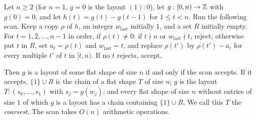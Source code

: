 \begin{theorem}\label{thm:decide}
Let $n \ge 2$ (for $n = 1$, $g = 0$ is the layout $(1){:}0$), let
$g : [0,n) \to \mathbb{Z}$ with $g(0) = 0$, and let $h(t) = g(t) - g(t-1)$ for
$1 \le t < n$. Run the following scan. Keep a copy $\rho$ of $h$, an integer
$w_{\mathrm{last}}$ initially $1$, and a set $R$ initially empty. For
$t = 1, 2, \dots, n-1$ in order, if $\rho(t) \ne 0$: if $t \nmid n$ or
$w_{\mathrm{last}} \nmid t$, reject; otherwise put $t$ in $R$, set
$a_t = \rho(t)$ and $w_{\mathrm{last}} = t$, and replace $\rho(t')$ by
$\rho(t') - a_t$ for every multiple $t'$ of $t$ in $[t, n)$. If no $t$
rejects, accept.

Then $g$ is a layout of some flat shape of size $n$ if and only if the scan
accepts. If it accepts, $\{1\} \cup R$ is the chain of a flat shape $T$ of
size $n$; $g$ is the layout $T{:}(s_k,\dots,s_1)$ with $s_j = g(w_j)$; and
every flat shape of size $n$ without entries of size $1$ of which $g$ is a
layout has a chain containing $\{1\} \cup R$. We call this $T$ the
\emph{coarsest}. The scan takes $O(n)$ arithmetic operations.
\end{theorem}
